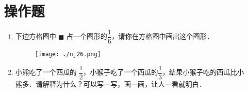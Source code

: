 \documentclass[12pt,twoside,space]{ctexart}
\begin{document}
    \section{操作题}
      \begin{enumerate}[itemsep=0.2em, topsep=0pt]
        \item 下边方格图中 $\blacksquare$ 占一个图形的$\dfrac{1}{6}$，请你在方格图中画出这个图形．
          \begin{figure}[H]
            \centering
            \texttt{[image: ./nj26.png]}
          \end{figure}

          \item 小熊吃了一个西瓜的 $\dfrac{1}{2}$，小猴子吃了一个西瓜的$\dfrac{1}{3}$，结果小猴子吃的西瓜比小熊多．请解释为什么？可以写一写，画一画，让人一看就明白．
      \end{enumerate}
\end{document}
